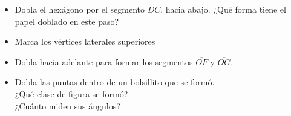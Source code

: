 \documentclass[10pt,twoside]{article}
\begin{document}
\begin{minipage}{.35\textwidth}
\end{minipage}
\begin{minipage}{.6\textwidth}
\begin{itemize}
\item Dobla el hexágono por el segmento $\overline{DC}$, hacia abajo.
	 ¿Qué forma tiene el papel doblado en este paso?
\item Marca los vértices laterales superiores
\end{itemize}
\end{minipage}

\begin{minipage}{.35\textwidth}
\end{minipage}
\begin{minipage}{.6\textwidth}
\begin{itemize}
\item Dobla hacia adelante para formar los segmentos $\overline{OF}$
y $\overline{OG}$.
\end{itemize}
\end{minipage}

\begin{minipage}{.6\textwidth}
\begin{itemize}
\item Dobla las puntas dentro de un bolsillito que se formó.\\
	 ¿Qué clase de figura se formó?\\
¿Cuánto miden sus ángulos?
\end{itemize}
\end{minipage}
\begin{minipage}{.6\textwidth}
\end{minipage}
\end{document}
